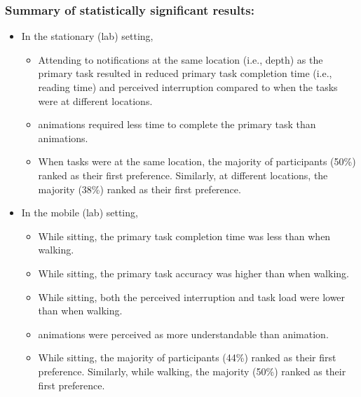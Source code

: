 \subsubsection*{Summary of statistically significant results:}
{\small
\begin{itemize}
    \item In the stationary (lab) setting, 
    \begin{itemize}
        \item Attending to notifications at the same location (i.e., depth) as the primary task resulted in reduced primary task completion time (i.e., reading time) and perceived interruption compared to when the tasks were at different locations.
        \item \Slowfade{} animations required less time to complete the primary task than \scroll{} animations.
        \item When tasks were at the same location, the majority of participants (50\%) ranked \scroll{} as their first preference. Similarly, at different locations, the majority (38\%) ranked \slowfade{} as their first preference.
    \end{itemize}
    \item In the mobile (lab) setting, 
    \begin{itemize}
        \item While sitting, the primary task completion time was less than when walking.
        \item While sitting, the primary task accuracy was higher than when walking.
        \item While sitting, both the perceived interruption and task load were lower than when walking.
        \item \Slowfade{} animations were perceived as more understandable than \scroll{} animation.
        \item While sitting, the majority of participants (44\%) ranked \scroll{} as their first preference. Similarly, while walking, the majority (50\%) ranked \slowfade{} as their first preference.
    \end{itemize}
\end{itemize}
}